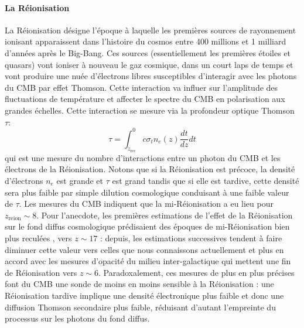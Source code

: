 \paragraph{La Réionisation} 
La Réionisation désigne l'époque à laquelle les premières sources de rayonnement ionisant apparaissent dans l'histoire du cosmos entre 400 millions et 1 milliard d'années après le Big-Bang. Ces sources (essentiellement les premières étoiles et quasars) vont ioniser à nouveau le gaz cosmique, dans un court laps de temps et vont produire une nuée d'électrons libres susceptibles d'interagir avec les photons du CMB par effet Thomson. Cette interaction va influer sur l'amplitude des fluctuations de température et affecter le spectre du CMB en polarisation aux grandes échelles. Cette interaction se mesure via la profondeur optique Thomson $\tau$:
\begin{equation}
\tau=\int_{z_\mathrm{rec}}^{0} c\sigma_t n_e(z)\frac{dt}{dz}dt
\end{equation}
qui est une mesure du nombre d'interactions entre un photon du CMB et les électrons de la Réionisation. Notons que si la Réionisation est précoce, la densité d'électrons $n_e$ est grande et $\tau$ est grand tandis que si elle est tardive, cette densité sera plus faible par simple dilution cosmologique conduisant à une faible valeur de $\tau$. Les mesures du CMB indiquent que la mi-Réionisation a eu lieu pour $z_\mathrm{reion}\sim8$. Pour l'anecdote, les premières estimations de l'effet de la Réionisation sur le fond diffus cosmologique prédisaient des époques de mi-Réionisation bien plus reculées , vers $z\sim 17$ : depuis, les estimations successives tendent à faire diminuer cette valeur vers celles que nous connaissons actuellement et plus en accord avec les mesures d'opacité du milieu inter-galactique qui mettent une fin de Réionisation vers $z\sim 6$. Paradoxalement, ces mesures de plus en plus précises font du CMB une sonde de moins en moins sensible à la Réionisation : une Réionisation tardive implique une densité électronique plus faible et donc une diffusion Thomson secondaire plus faible, réduisant d'autant l'empreinte du processus sur les photons du fond diffus.

